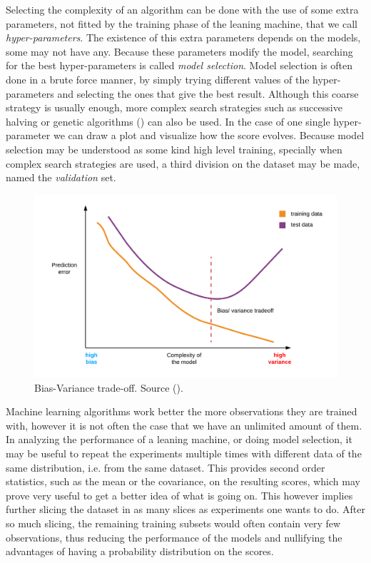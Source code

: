 Selecting the complexity of an algorithm can be done with the use of some extra parameters, not fitted by the training phase of the leaning machine, that we call \emph{hyper-parameters}. The existence of this extra parameters depends on the models, some may not have any. Because these parameters modify the model, searching for the best hyper-parameters is called \emph{model selection}. Model selection is often done in a brute force manner, by simply trying different values of the hyper-parameters and selecting the ones that give the best result. Al\-though this coarse strategy is usually enough, more complex search strategies such as successive halving or genetic algo\-rithms (\cite{claesen_hyperparameter_2015}) can also be used. In the case of one single hyper-parameter we can draw a plot and visualize how the score evolves. Because model selection may be understood as some kind high level training, specially when com\-plex search strategies are used, a third division on the dataset may be made, named the \emph{validation} set.

\begin{figure}[H]
    \centering
    \includegraphics[width=0.5\linewidth]{img/ch4/bias-and-variance.png}
    \caption[Bias-Variance trade-off]{Bias-Variance trade-off. Source (\cite{bisong_machine_2021}).}
    \label{fig:ch4.biasvariance}
\end{figure}

Machine learning algorithms work better the more observations they are trained with, however it is not often the case that we have an unlimited amount of them. In analyzing the performance of a leaning machine, or doing model selection, it may be useful to repeat the experiments multiple times with different data of the same distribution, i.e. from the same dataset. This provides second order statistics, such as the mean or the covariance, on the resulting scores, which may prove very useful to get a better idea of what is going on. This however implies further slicing the dataset in as many slices as experiments one wants to do. After so much slicing, the remaining training subsets would often contain very few observations, thus reducing the performance of the models and nullifying the advantages of having a probability distribution on the scores. 

